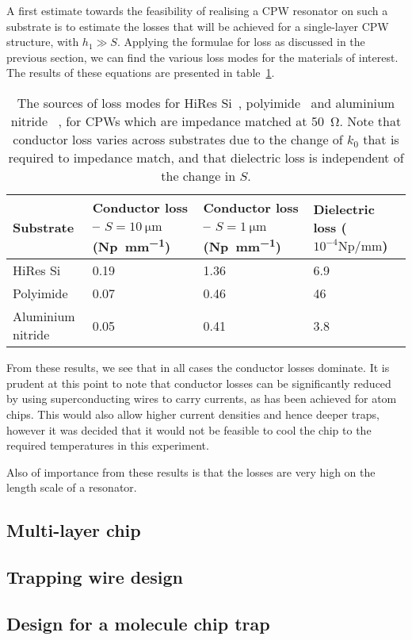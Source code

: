 A first estimate towards the feasibility of realising a CPW resonator on such a
substrate is to estimate the losses that will be achieved for a single-layer CPW
structure, with $h_1 \gg S$. Applying the formulae for loss as discussed in the
previous section, we can find the various loss modes for the materials of
interest. The results of these equations are presented in
table~\ref{table:losses}.

\begin{table}[h]
  \begin{tabularx}{\textwidth}{lXXX}
    Substrate &
    Conductor loss -- $S=\SI{10}{\micro\meter}$ (\si{\neper \per \milli \meter})
    & Conductor loss -- $S=\SI{1}{\micro\meter}$ (\si{\neper \per \milli \meter})
    & Dielectric loss ($10^{-4}\si{\neper \per \milli \meter}$) \\
    \hline
    HiRes Si & 0.19 & 1.36 & 6.9 \\
    Polyimide & 0.07 & 0.46 & 46 \\
    Aluminium nitride & 0.05 & 0.41 & 3.8
  \end{tabularx}
    \caption{
       The sources
      of loss modes for HiRes Si~\cite{1717770, 517417},
      polyimide~\cite{5734805}  and aluminium nitride~\cite{1666171} , for CPWs which are impedance matched at \SI{50}{\ohm}.
      Note that conductor loss varies across substrates due to the change of
      $k_0$ that is required to impedance match, and that dielectric loss is
      independent of the change in $S$. }
    \label{table:losses}
\end{table}

From these results, we see that in all cases the conductor losses dominate.  It
  is prudent at this point to note that conductor losses can be significantly
  reduced by using superconducting wires to carry currents, as has been achieved
  for atom chips\cite{PhysRevLett.97.200405, Hattermann2017}. This would also
  allow higher current densities and hence deeper traps, however it was decided
  that it would not be feasible to cool the chip to the required temperatures in
  this experiment.

Also of importance from these results is that the losses are very high on the
  length scale of a resonator. 

\subsection{Multi-layer chip}

\subsection{Trapping wire design}

\subsection{Design for a molecule chip trap}

